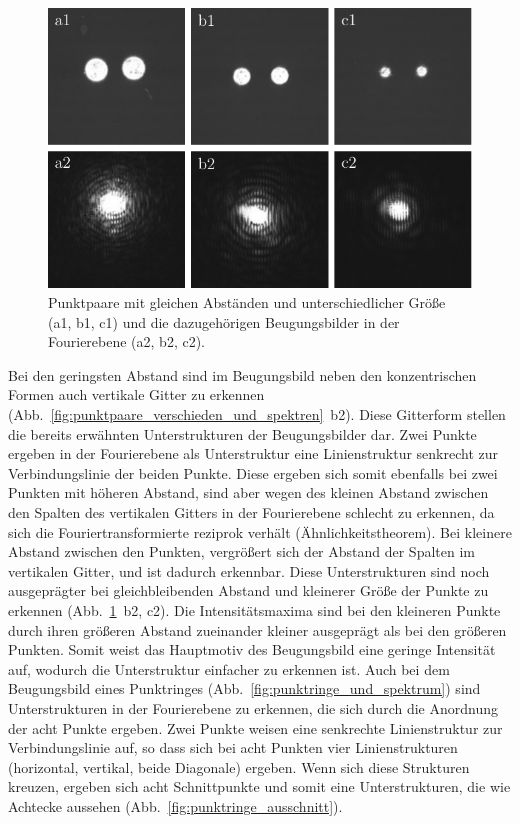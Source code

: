 \begin{figure}[h]
	\centering
	\includegraphics{images/Regina/abb16.pdf}
	\caption[Punktpaare gleicher Abstände und Fourierspektren]{
		Punktpaare mit gleichen Abständen und unterschiedlicher Größe (a1, b1, c1) und die dazugehörigen Beugungsbilder in der Fourierebene (a2, b2, c2).
	}
	\label{fig:punktpaare_gleich_und_spektren}
\end{figure}

Bei den geringsten Abstand sind im Beugungsbild neben den konzentrischen Formen auch vertikale Gitter zu erkennen (Abb.~\ref{fig:punktpaare_verschieden_und_spektren}~b2). Diese Gitterform stellen die bereits erwähnten Unterstrukturen der Beugungsbilder dar. Zwei Punkte ergeben in der Fourierebene als
Unterstruktur eine Linienstruktur senkrecht zur Verbindungslinie der beiden Punkte. Diese ergeben sich somit ebenfalls bei zwei Punkten mit höheren Abstand, sind aber wegen des kleinen Abstand zwischen den Spalten des vertikalen Gitters in der Fourierebene schlecht zu erkennen, da sich die Fouriertransformierte reziprok verhält (Ähnlichkeitstheorem). Bei kleinere Abstand zwischen den Punkten, vergrößert sich der Abstand der Spalten im vertikalen Gitter, und ist dadurch erkennbar. Diese Unterstrukturen sind noch ausgeprägter bei gleichbleibenden Abstand und kleinerer Größe der Punkte zu erkennen (Abb.~\ref{fig:punktpaare_gleich_und_spektren}~b2, c2). Die Intensitätsmaxima sind bei den kleineren Punkte durch ihren größeren Abstand zueinander kleiner ausgeprägt als bei den größeren Punkten. Somit weist das Hauptmotiv des Beugungsbild eine geringe Intensität auf, wodurch die Unterstruktur einfacher zu erkennen
ist.
Auch bei dem Beugungsbild eines Punktringes (Abb.~\ref{fig:punktringe_und_spektrum}) sind Unterstrukturen in der Fourierebene zu erkennen, die sich durch die Anordnung der acht Punkte ergeben. Zwei Punkte weisen eine senkrechte Linienstruktur zur Verbindungslinie auf, so dass sich bei acht Punkten vier Linienstrukturen (horizontal, vertikal, beide Diagonale) ergeben. Wenn sich diese Strukturen kreuzen, ergeben sich acht Schnittpunkte und somit eine Unterstrukturen, die wie Achtecke aussehen (Abb.~\ref{fig:punktringe_ausschnitt}).

